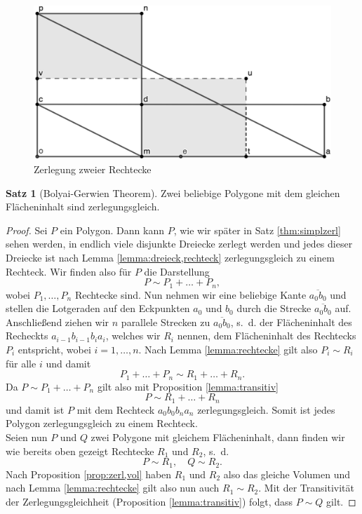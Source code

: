 \documentclass[11pt,titlepage]{article}
\theoremstyle{definition}
\newtheorem{theorem}{Satz}[section]
\theoremstyle{remark}
\begin{document}
	\begin{figure}[!htbp]
		\centering
		\includegraphics[scale=0.8]{Rechteck2}
		\caption{Zerlegung zweier Rechtecke}
		\label{Abb.3}
	\end{figure}
	
	\begin{theorem}[Bolyai-Gerwien Theorem] \label{theorem:bolyai-gerwien}
		Zwei beliebige Polygone mit dem gleichen Flächeninhalt sind zerlegungsgleich.
	\end{theorem}
	
	\begin{proof}
		Sei $P$ ein Polygon. Dann kann $P$, wie wir später in Satz \ref{thm:simplzerl} sehen werden, in endlich viele disjunkte Dreiecke zerlegt werden und jedes dieser 
		Dreiecke ist nach Lemma \ref{lemma:dreieck,rechteck} zerlegungsgleich zu einem Rechteck. Wir finden 
		also für $P$ die Darstellung
		\[ P\sim P_1+\ldots+P_n,\]
		wobei $P_1,\ldots,P_n$ Rechtecke sind. Nun nehmen wir eine beliebige Kante $\overline{a_0b_0}$ und 
		stellen die Lotgeraden auf den Eckpunkten $a_0$ und $b_0$ durch die Strecke $\overline{a_0b_0}$ 
		auf. Anschließend ziehen wir $n$ 
		parallele Strecken zu $\overline{a_0b_0}$, s.~d. der Flächeninhalt des Recheckts $a_{i-1}b_{i-1}b_ia_i$, 
		welches wir $R_i$ nennen, dem Flächeninhalt des Rechtecks $P_i$ entspricht, wobei $i=1,\ldots,n$. 
		Nach Lemma \ref{lemma:rechtecke} gilt also $P_i\sim R_i$ für alle $i$ und damit
		\[ P_1+\ldots+P_n\sim R_1+\ldots+R_n. \]
		Da $P\sim P_1+\ldots+P_n$ gilt also mit Proposition \ref{lemma:transitiv}
		\[ P\sim R_1+\ldots+R_n\]
		und damit ist $P$ mit dem Rechteck $a_0b_0b_na_n$ zerlegungsgleich. 
		Somit ist jedes Polygon zerlegungsgleich zu einem Rechteck. \\
		Seien nun $P$ und $Q$ zwei Polygone mit gleichem Flächeninhalt, dann finden wir wie bereits oben gezeigt 
		Rechtecke $R_1$ und $R_2$, s.~d.
		\[ P\sim R_1,\quad Q\sim R_2.\]
		Nach Proposition \ref{prop:zerl,vol} haben $R_1$ und $R_2$ also das 
		gleiche Volumen und nach Lemma \ref{lemma:rechtecke} gilt also nun auch 
		$R_1\sim R_2$. Mit der Transitivität 
		der Zerlegungsgleichheit 
		(Proposition \ref{lemma:transitiv}) folgt, dass $P\sim Q$ gilt.
	\end{proof}
	
\end{document}
